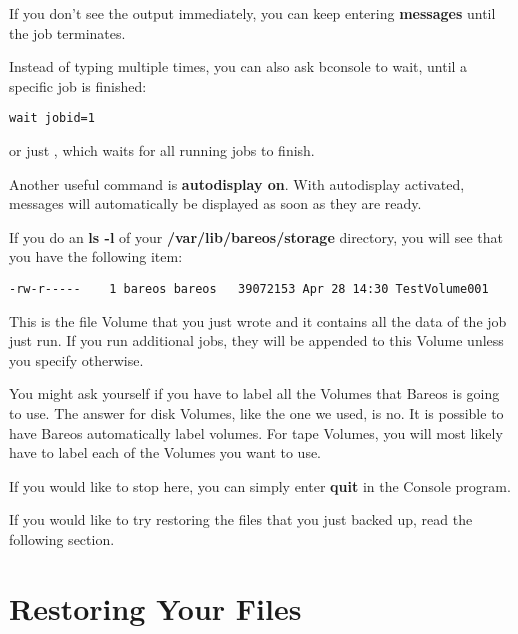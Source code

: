 If you don't see the output immediately, you can keep entering {\bf messages}
until the job terminates.

Instead of typing  multiple times, 
you can also ask bconsole to wait, until a specific job is finished:
\footnotesize
\begin{verbatim}
wait jobid=1
\end{verbatim}
\normalsize
or just , which waits for all running jobs to finish.

Another useful command is {\bf autodisplay on}. 
With autodisplay activated, messages will automatically be displayed as soon as they are ready.

If you do an {\bf ls -l} of your {\bf /var/lib/bareos/storage} directory, you will see that you
have the following item:

\footnotesize
\begin{verbatim}
-rw-r-----    1 bareos bareos   39072153 Apr 28 14:30 TestVolume001
\end{verbatim}
\normalsize

This is the file Volume that you just wrote and it contains all the data of
the job just run. If you run additional jobs, they will be appended to this
Volume unless you specify otherwise.

You might ask yourself if you have to label all the Volumes that Bareos is
going to use. The answer for disk Volumes, like the one we used, is no. It is
possible to have Bareos automatically label volumes. For tape Volumes, you
will most likely have to label each of the Volumes you want to use.

If you would like to stop here, you can simply enter {\bf quit} in the Console
program.

% 
% 

If you would like to try restoring the files that you just backed up, read the
following section.
\label{restoring}

\section{Restoring Your Files}

